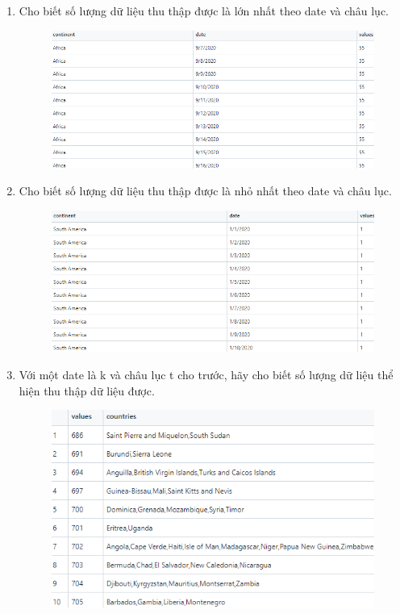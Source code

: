 \documentclass[a4paper]{article}
\theoremstyle{definition}
\begin{document}
\begin{enumerate}[i)]
\begin{enumerate}[1)]
\begin{figure}[H]
			\end{figure}
            \item Cho biết số lượng dữ liệu thu thập được là lớn nhất theo date và châu lục.
            \begin{figure}[H]
				\centering
				\includegraphics[scale=0.8]{images/1.13.png}
			\end{figure}
            \item Cho biết số lượng dữ liệu thu thập được là nhỏ nhất theo date và châu lục.
            \begin{figure}[H]
				\centering
				\includegraphics[scale=0.8]{images/1.14.png}
			\end{figure}
            \item Với một date là k và châu lục t cho trước, hãy cho biết số lượng dữ liệu thể hiện thu thập dữ liệu được.
            \begin{figure}[H]
				\centering
				\includegraphics{images/1.15.png}

\end{figure}
\end{enumerate}
\end{enumerate}
\end{document}
